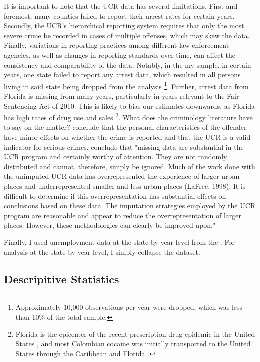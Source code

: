 \documentclass{article}
\begin{document}
It is important to note that the UCR data has several limitations. First and foremost, many counties failed to report their arrest rates for certain years. Secondly, the UCR's hierarchical reporting system requires that only the most severe crime be recorded in cases of multiple offenses, which may skew the data. Finally, variations in reporting practices among different law enforcement agencies, as well as changes in reporting standards over time, can affect the consistency and comparability of the data. Notably, in the my sample, in certain years, one state failed to report any arrest data, which resulted in all persons living in said state being dropped from the analysis \footnote{Approximately 10,000 observations per year were dropped, which was less than 10\% of the total sample.}. Further, arrest data from Florida is missing from many years, particularly in years relevant to the Fair Sentencing Act of 2010. This is likely to bias our estimates downwards, as Florida has high rates of drug use and sales \footnote{Florida is the epicenter of the recent prescription drug epidemic in the United States \citep{lee}, and most Colombian cocaine was initially transported to the United States through the Caribbean and Florida \citep{williams}.}.  What does the criminology literature have to say on the matter? \cite{gove} conclude that the personal characteristics of the offender have minor effects on whether the crime is reported and that the UCR is a valid indicator for serious crimes. \cite{lynch} conclude that "missing data are substantial in the UCR program and certainly worthy of attention. They are not randomly distributed and cannot, therefore, simply be ignored. Much of the work done with the unimputed UCR data has overrepresented the experience of larger urban places and underrepresented smaller and less urban places (LaFree, 1998). It is difficult to determine if this overrepresentation has substantial effects on conclusions based on these data. The imputation strategies employed by the UCR program are reasonable and appear to reduce the overrepresentation of larger places. However, these methodologies can clearly be improved upon."

Finally, I used unemployment data at the state by year level from the \cite{unemployment_data}. For analysis at the state by year level, I simply collapse the dataset.

\subsection{Descripitive Statistics}
\end{document}
